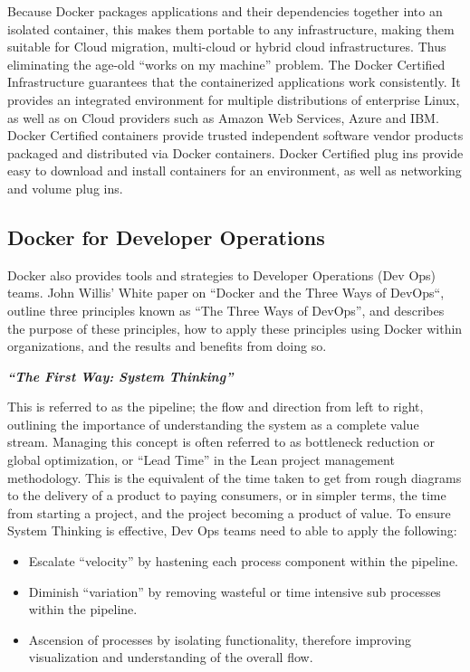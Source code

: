 Because Docker packages applications and their dependencies together into an isolated container, this makes them portable to any infrastructure, making them suitable for Cloud migration, multi-cloud or hybrid cloud infrastructures. Thus eliminating the age-old “works on my machine” problem. The Docker Certified Infrastructure guarantees that the containerized applications work consistently. It provides an integrated environment for multiple distributions of enterprise Linux, as well as on Cloud providers such as Amazon Web Services, Azure and IBM. Docker Certified containers provide trusted independent software vendor products packaged and distributed via Docker containers. Docker Certified plug ins provide easy to download and install containers for an environment, as well as networking and volume plug ins.

\subsection{Docker for Developer Operations}
Docker also provides tools and strategies to Developer Operations (Dev Ops) teams. John Willis’ White paper on “Docker and the Three Ways of DevOps“, outline three principles known as “The Three Ways of DevOps”, and describes the purpose of these principles, how to apply these principles using Docker within organizations, and the results and benefits from doing so. 



\textbf{\emph{“The First Way: System Thinking”}}

This is referred to as the pipeline; the flow and direction from left to right, outlining the importance of understanding the system as a complete value stream. Managing this concept is often referred to as bottleneck reduction or global optimization, or “Lead Time” in the Lean project management methodology\cite{willis}. This is the equivalent of the time taken to get from rough diagrams to the delivery of a product to paying consumers, or in simpler terms, the time from starting a project, and the project becoming a product of value\cite{willis}.  To ensure System Thinking is effective, Dev Ops teams need to able to apply the following:

\begin{itemize}
\item Escalate “velocity” by hastening each process component within the pipeline.
\item Diminish “variation” by removing wasteful or time intensive sub processes within the pipeline.
\item Ascension of processes by isolating functionality, therefore improving visualization and understanding of the overall flow.
\end{itemize}

